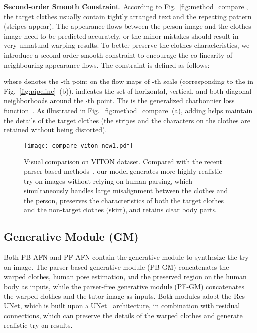 \documentclass[final]{cvpr}
\begin{document}
	\textbf{Second-order Smooth Constraint}.
According to Fig.~\ref{fig:method_compare}, the target clothes usually contain tightly arranged text and the repeating pattern (\eg stripes appear). 
The appearance flows between the person image and the clothes image need to be predicted accurately, or the minor mistakes should result in very unnatural warping results.
To better preserve the clothes characteristics, we introduce a second-order smooth constraint to encourage the co-linearity of neighbouring appearance flows.
The constraint is defined as follows:
\begin{small}
		
	\end{small}
where  denotes the -th point on the flow maps of -th scale (\ie corresponding to the  in Fig.~\ref{fig:pipeline}~(b)).
 indicates the set of horizontal, vertical, and both diagonal neighborhoods around the -th point. 
The  is the generalized charbonnier loss function~\cite{loss}.  
As illustrated in Fig.~\ref{fig:method_compare} (a), adding  helps maintain the details of the target clothes (\ie the stripes and the characters on the clothes are retained without being distorted).
	
	
	
	
	
	
	\begin{figure*}
		\begin{center}
			\texttt{[image: compare\_viton\_new1.pdf]}
		\end{center}
		\vspace{-3mm}
		\caption{Visual comparison on VITON dataset. Compared with the recent parser-based methods~\cite{cpvton,clothflow,cpvton_plus,ACGPN}, our model generates more highly-realistic try-on images without relying on human parsing, which simultaneously handles large misalignment between the clothes and the person, preserves the characteristics of both the target clothes and the non-target clothes (\ie skirt), and retains clear body parts.}
		\vspace{-10pt}
		\label{fig:vis_viton}
	\end{figure*}
	
		
	
	
	\subsection{Generative Module (GM)} \label{sec:gm}
Both PB-AFN and PF-AFN contain the generative module to synthesize the try-on image.
The parser-based generative module (PB-GM) concatenates the warped clothes, human pose estimation, and the preserved region on the human body as inputs, while the parser-free generative module (PF-GM) concatenates the warped clothes and the tutor image  as inputs.
Both modules adopt the Res-UNet, which is built upon a UNet~\cite{unet} architecture, in combination with residual connections, which can preserve the details of the warped clothes and generate realistic try-on results.
	
\end{document}
